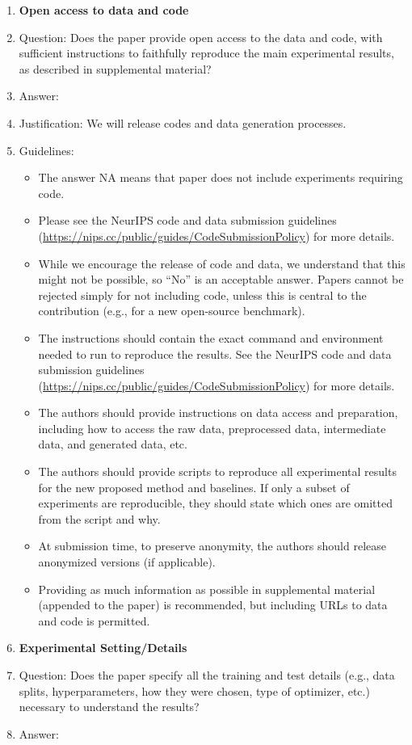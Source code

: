 \documentclass[11pt]{article}
\theoremstyle{plain}
\theoremstyle{definition}
\theoremstyle{remark}
\renewcommand{\^}[1]{^{(#1)}}
\begin{document}
\begin{enumerate}
\item {\bf Open access to data and code}
    \item[] Question: Does the paper provide open access to the data and code, with sufficient instructions to faithfully reproduce the main experimental results, as described in supplemental material?
    \item[] Answer:\answerYes{} 
    \item[] Justification: We will release codes and data generation processes. 
    \item[] Guidelines:
    \begin{itemize}
        \item The answer NA means that paper does not include experiments requiring code.
        \item Please see the NeurIPS code and data submission guidelines (\url{https://nips.cc/public/guides/CodeSubmissionPolicy}) for more details.
        \item While we encourage the release of code and data, we understand that this might not be possible, so “No” is an acceptable answer. Papers cannot be rejected simply for not including code, unless this is central to the contribution (e.g., for a new open-source benchmark).
        \item The instructions should contain the exact command and environment needed to run to reproduce the results. See the NeurIPS code and data submission guidelines (\url{https://nips.cc/public/guides/CodeSubmissionPolicy}) for more details.
        \item The authors should provide instructions on data access and preparation, including how to access the raw data, preprocessed data, intermediate data, and generated data, etc.
        \item The authors should provide scripts to reproduce all experimental results for the new proposed method and baselines. If only a subset of experiments are reproducible, they should state which ones are omitted from the script and why.
        \item At submission time, to preserve anonymity, the authors should release anonymized versions (if applicable).
        \item Providing as much information as possible in supplemental material (appended to the paper) is recommended, but including URLs to data and code is permitted.
    \end{itemize}

\item {\bf Experimental Setting/Details}
    \item[] Question: Does the paper specify all the training and test details (e.g., data splits, hyperparameters, how they were chosen, type of optimizer, etc.) necessary to understand the results?
    \item[] Answer:\answerYes{} 


\end{enumerate}
\end{document}
